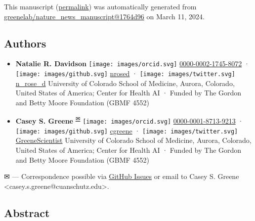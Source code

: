 This manuscript
(\href{https://greenelab.github.io/nature_news_manuscript/v/1764d963796921cd6403a26a106c86e63475dcba/}{permalink})
was automatically generated
from \href{https://github.com/greenelab/nature_news_manuscript/tree/1764d963796921cd6403a26a106c86e63475dcba}{greenelab/nature\_news\_manuscript@1764d96}
on March 11, 2024.

\hypertarget{authors}{%
\subsection{Authors}\label{authors}}

\begin{itemize}
\item
  \textbf{Natalie R. Davidson}
  \texttt{[image: images/orcid.svg]}
  \href{https://orcid.org/0000-0002-1745-8072}{0000-0002-1745-8072}
  · \texttt{[image: images/github.svg]}
  \href{https://github.com/nrosed}{nrosed}
  · \texttt{[image: images/twitter.svg]}
  \href{https://twitter.com/n_rose_d}{n\_rose\_d}
  University of Colorado School of Medicine, Aurora, Colorado, United States of America; Center for Health AI
  · Funded by The Gordon and Betty Moore Foundation (GBMF 4552)
\item
  \textbf{Casey S. Greene}
  \textsuperscript{\protect\hyperlink{correspondence}{✉}}
  \texttt{[image: images/orcid.svg]}
  \href{https://orcid.org/0000-0001-8713-9213}{0000-0001-8713-9213}
  · \texttt{[image: images/github.svg]}
  \href{https://github.com/cgreene}{cgreene}
  · \texttt{[image: images/twitter.svg]}
  \href{https://twitter.com/GreeneScientist}{GreeneScientist}
  University of Colorado School of Medicine, Aurora, Colorado, United States of America; Center for Health AI
  · Funded by The Gordon and Betty Moore Foundation (GBMF 4552)
\end{itemize}

\leavevmode{}%
✉ --- Correspondence possible via \href{https://github.com/greenelab/nature_news_manuscript/issues}{GitHub Issues}
or email to
Casey S. Greene \textless casey.s.greene@cuanschutz.edu\textgreater.

\hypertarget{abstract}{%
\subsection{Abstract}\label{abstract}}

